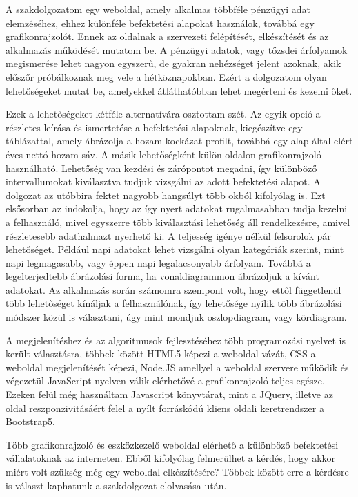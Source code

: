 
	A szakdolgozatom egy weboldal, amely alkalmas többféle pénzügyi adat elemzéséhez, ehhez különféle befektetési alapokat használok, továbbá egy grafikonrajzolót. Ennek az oldalnak a szervezeti felépítését, elkészítését és az alkalmazás működését mutatom be.
	A pénzügyi adatok, vagy tőzsdei árfolyamok megismerése lehet nagyon egyszerű, de gyakran nehézséget jelent azoknak, akik előszőr próbálkoznak meg vele a hétköznapokban. Ezért a dolgozatom olyan lehetőségeket mutat be, amelyekkel átláthatóbban lehet megérteni és kezelni őket.

	Ezek a lehetőségeket kétféle alternatívára osztottam szét. Az egyik opció a részletes leírása és ismertetése a befektetési alapoknak, kiegészítve egy táblázattal, amely ábrázolja a hozam-kockázat profilt, továbbá egy alap által elért éves nettó hozam sáv. A másik lehetőségként külön oldalon grafikonrajzoló használható. Lehetőség van kezdési és zárópontot megadni, így különböző intervallumokat kiválasztva tudjuk vizsgálni az adott befektetési alapot. A dolgozat az utóbbira fektet nagyobb hangsúlyt több okból kifolyólag is. Ezt elsősorban az indokolja, hogy az így nyert adatokat rugalmasabban tudja kezelni a felhasználó, mivel egyszerre több kiválasztási lehetőség áll rendelkezésre, amivel részletesebb adathalmazt nyerhető ki. A teljesség igénye nélkül felsorolok pár lehetőséget. Például napi adatokat lehet vizsgálni olyan kategóriák szerint, mint napi legmagasabb, vagy éppen napi legalacsonyabb árfolyam. Továbbá a legelterjedtebb ábrázolási forma, ha vonaldiagrammon ábrázoljuk a kívánt adatokat. Az alkalmazás során számomra szempont volt, hogy ettől függetlenül több lehetőséget kínáljak a felhasználónak, így lehetősége nyílik több ábrázolási módszer közül is választani, úgy mint mondjuk oszlopdiagram, vagy kördiagram.

	A megjelenítéshez és az algoritmusok fejlesztéséhez több programozási nyelvet is került választásra, többek között HTML5 képezi a weboldal vázát, CSS a weboldal megjelenítését képezi, Node.JS amellyel a weboldal szervere működik és végezetül JavaScript nyelven válik elérhetővé a grafikonrajzoló teljes egésze. Ezeken felül még használtam Javascript könyvtárat, mint a JQuery, illetve az oldal reszponzivitásáért felel a nyílt forráskódú kliens oldali keretrendszer a Bootstrap5.

	Több grafikonrajzoló és eszközkezelő weboldal elérhető a különböző befektetési vállalatoknak az interneten.  Ebből kifolyólag felmerülhet a kérdés, hogy akkor miért volt szükség még egy weboldal elkészítésére? Többek között erre a kérdésre is választ kaphatunk a szakdolgozat elolvasása után.
